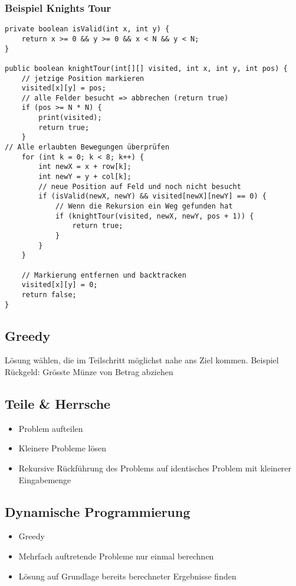 \begin{multicols*}{5}
		\subsubsection{Beispiel Knights Tour}
			\begin{lstlisting}
private boolean isValid(int x, int y) {
	return x >= 0 && y >= 0 && x < N && y < N;
}

public boolean knightTour(int[][] visited, int x, int y, int pos) {
	// jetzige Position markieren
	visited[x][y] = pos;
	// alle Felder besucht => abbrechen (return true)
	if (pos >= N * N) {
		print(visited);
		return true;
	}
// Alle erlaubten Bewegungen überprüfen
	for (int k = 0; k < 8; k++) {
		int newX = x + row[k];
		int newY = y + col[k];
		// neue Position auf Feld und noch nicht besucht
		if (isValid(newX, newY) && visited[newX][newY] == 0) {
			// Wenn die Rekursion ein Weg gefunden hat
			if (knightTour(visited, newX, newY, pos + 1)) {
				return true;
			}
		}
	}
	
	// Markierung entfernen und backtracken
	visited[x][y] = 0;
	return false;
}
			\end{lstlisting}

	\subsection{Greedy}
	Lösung wählen, die im Teilschritt möglichst nahe ans Ziel kommen.
	Beispiel Rückgeld: Grösste Münze von Betrag abziehen

	\subsection{Teile \& Herrsche}
		\begin{itemize}
			\item Problem aufteilen
			\item Kleinere Probleme lösen
			\item Rekursive Rückführung des Problems auf identisches Problem mit kleinerer Eingabemenge
		\end{itemize}
	
	\subsection{Dynamische Programmierung}
		\begin{itemize}
			\item Greedy
			\item Mehrfach auftretende Probleme nur einmal berechnen
			\item Lösung auf Grundlage bereits berechneter Ergebnisse finden
		\end{itemize}


\end{multicols*}
